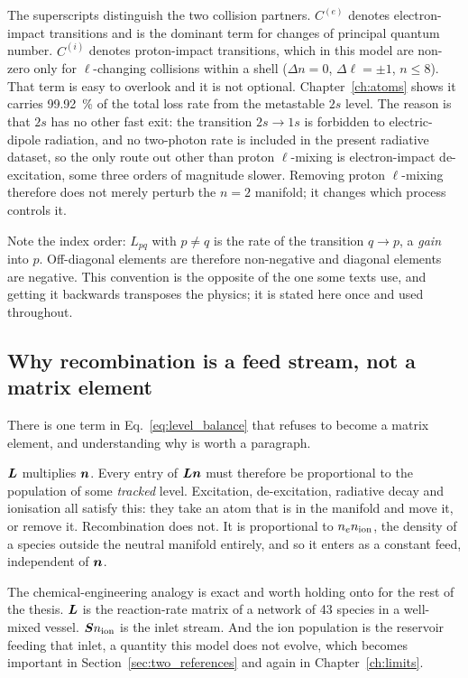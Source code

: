 The superscripts distinguish the two collision partners. $C^{(e)}$ denotes
electron-impact transitions and is the dominant term for changes of principal
quantum number. $C^{(i)}$ denotes proton-impact transitions, which in this model
are non-zero only for $\ell$-changing collisions within a shell
($\Delta n = 0$, $\Delta\ell = \pm1$, $n \le 8$). That term is easy to overlook
and it is not optional. Chapter~\ref{ch:atoms} shows it carries
\SI{99.92}{\percent} of the total loss rate from the metastable $2s$ level.
The reason is that $2s$ has no other fast exit: the transition $2s \to 1s$ is
forbidden to electric-dipole radiation, and no two-photon rate is included in
the present radiative dataset, so the only route out other than proton
$\ell$-mixing is electron-impact de-excitation, some three orders of magnitude
slower. Removing proton $\ell$-mixing therefore does not merely perturb the
$n=2$ manifold; it changes which process controls it.

\noindent Note the index order: $L_{pq}$ with $p \neq q$ is the rate of the
transition $q \to p$, a \emph{gain} into $p$. Off-diagonal elements are
therefore non-negative and diagonal elements are negative. This convention is
the opposite of the one some texts use, and getting it backwards transposes the
physics; it is stated here once and used throughout.

\subsection{Why recombination is a feed stream, not a matrix element}

There is one term in Eq.~\eqref{eq:level_balance} that refuses to become a
matrix element, and understanding why is worth a paragraph.

$\bm{L}$ multiplies $\bm{n}$. Every entry of $\bm{L}\bm{n}$ must therefore be
proportional to the population of some \emph{tracked} level. Excitation,
de-excitation, radiative decay and ionisation all satisfy this: they take an
atom that is in the manifold and move it, or remove it. Recombination does
not. It is proportional to $n_en_{\mathrm{ion}}$, the density of a species outside the
neutral manifold entirely, and so it enters as a constant feed, independent of
$\bm{n}$.

The chemical-engineering analogy is exact and worth holding onto for the rest of
the thesis. $\bm{L}$ is the reaction-rate matrix of a network of 43 species in a
well-mixed vessel. $\bm{S}n_{\mathrm{ion}}$ is the inlet stream. And the ion population is
the reservoir feeding that inlet, a quantity this model does not evolve, which
becomes important in Section~\ref{sec:two_references} and again in
Chapter~\ref{ch:limits}.

